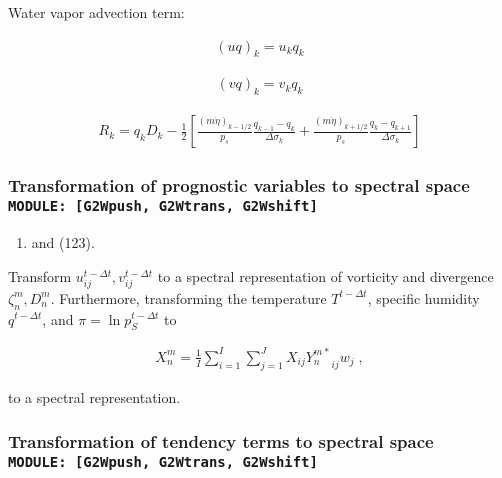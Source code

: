 Water vapor advection term:

\begin{eqnarray}
 (u q)_k  = u_k q_k
\end{eqnarray}

\begin{eqnarray}
 (v q)_k  = v_k q_k
\end{eqnarray}

\begin{eqnarray}
R_k  =  q_k D_k 
       - \frac{1}{2} 
             \left[   \frac{(m\dot{\eta})_{k-1/2}}{p_s} \frac{q_{k-1} - q_k}{\Delta\sigma_k}
               + \frac{(m\dot{\eta})_{k+1/2}}{p_s} \frac{q_k   - q_{k+1}}{\Delta\sigma_k} \right]
\end{eqnarray}

\hypertarget{transformation-of-prognostic-variables-to-spectral-space-module-g2wpush-g2wtrans-g2wshift}{%
\subsubsection{\texorpdfstring{Transformation of prognostic variables to
spectral space
\texttt{MODULE:\ {[}G2Wpush,\ G2Wtrans,\ G2Wshift{]}}}{Transformation of prognostic variables to spectral space MODULE: {[}G2Wpush, G2Wtrans, G2Wshift{]}}}\label{transformation-of-prognostic-variables-to-spectral-space-module-g2wpush-g2wtrans-g2wshift}}

\begin{enumerate}
\def\labelenumi{(\arabic{enumi})}
\setcounter{enumi}{121}
\tightlist
\item
  and (123).
\end{enumerate}

Transform \(u_{ij}^{t-\Delta t}, v_{ij}^{t-\Delta t}\) to a spectral
representation of vorticity and divergence \(\zeta_n^m, D_n^m\).
Furthermore, transforming the temperature \(T^{t-\Delta t}\), specific
humidity \(q^{t-\Delta t}\), and \(\pi = \ln p_S^{t-\Delta t}\) to

\begin{eqnarray}
  X_n^m  =  \frac{1}{I} \sum_{i=1}^{I} \sum_{j=1}^{J}  
               X_{ij} {Y_n^{m *}}_{ij}  w_j \; ,
\end{eqnarray}

to a spectral representation.

\hypertarget{transformation-of-tendency-terms-to-spectral-space-module-g2wpush-g2wtrans-g2wshift}{%
\subsubsection{\texorpdfstring{Transformation of tendency terms to
spectral space
\texttt{MODULE:\ {[}G2Wpush,\ G2Wtrans,\ G2Wshift{]}}}{Transformation of tendency terms to spectral space MODULE: {[}G2Wpush, G2Wtrans, G2Wshift{]}}}\label{transformation-of-tendency-terms-to-spectral-space-module-g2wpush-g2wtrans-g2wshift}}


